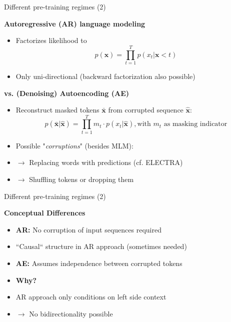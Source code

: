 
\begin{frame}{Different pre-training regimes (2)}

\vfill

	\textbf{Autoregressive (AR) language modeling}
	
	\begin{itemize}
		\item Factorizes likelihood to $$p(\mathbf{x}) = \prod_{t=1}^{T} p(x_t | \mathbf{x}{< t})$$
		\item Only uni-directional (backward factorization also possible)
	\end{itemize}

	\textbf{vs. (Denoising) Autoencoding (AE)}
	
	\begin{itemize}
		\item Reconstruct masked tokens $\bar{\mathbf{x}}$ from corrupted sequence $\hat{\mathbf{x}}$:
					$$p(\bar{\mathbf{x}}|\hat{\mathbf{x}}) = \prod_{t=1}^{T} m_t \cdot p(x_t | \hat{\mathbf{x}}), \text{with $m_t$ as masking indicator}$$
		\item Possible "\textit{corruptions}" (besides MLM):
		\item[] $\to$ Replacing words with predictions (cf. ELECTRA)
		\item[] $\to$ Shuffling tokens or dropping them
	\end{itemize}
	
\vfill

\end{frame}


\begin{frame}{Different pre-training regimes (2)}

\vfill
	
	\textbf{Conceptual Differences}
	
	\begin{itemize}
		\item \textbf{AR:} No corruption of input sequences required
		\item ``Causal`` structure in AR approach (sometimes needed)
		\item \textbf{AE:} Assumes independence between corrupted tokens
		\item[] \ques \textbf{Why?}
		\item AR approach only conditions on left side context
		\item[] $\to$ No bidirectionality possible
	\end{itemize}
	
\vfill

\end{frame}

